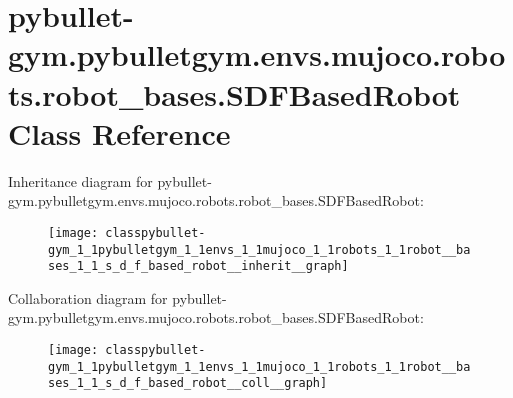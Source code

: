 \hypertarget{classpybullet-gym_1_1pybulletgym_1_1envs_1_1mujoco_1_1robots_1_1robot__bases_1_1_s_d_f_based_robot}{}\section{pybullet-\/gym.pybulletgym.\+envs.\+mujoco.\+robots.\+robot\+\_\+bases.\+S\+D\+F\+Based\+Robot Class Reference}
\label{classpybullet-gym_1_1pybulletgym_1_1envs_1_1mujoco_1_1robots_1_1robot__bases_1_1_s_d_f_based_robot}


Inheritance diagram for pybullet-\/gym.pybulletgym.\+envs.\+mujoco.\+robots.\+robot\+\_\+bases.\+S\+D\+F\+Based\+Robot\+:
\nopagebreak
\begin{figure}[H]
\begin{center}
\leavevmode
\texttt{[image: classpybullet-gym\_1\_1pybulletgym\_1\_1envs\_1\_1mujoco\_1\_1robots\_1\_1robot\_\_bases\_1\_1\_s\_d\_f\_based\_robot\_\_inherit\_\_graph]}
\end{center}
\end{figure}


Collaboration diagram for pybullet-\/gym.pybulletgym.\+envs.\+mujoco.\+robots.\+robot\+\_\+bases.\+S\+D\+F\+Based\+Robot\+:
\nopagebreak
\begin{figure}[H]
\begin{center}
\leavevmode
\texttt{[image: classpybullet-gym\_1\_1pybulletgym\_1\_1envs\_1\_1mujoco\_1\_1robots\_1\_1robot\_\_bases\_1\_1\_s\_d\_f\_based\_robot\_\_coll\_\_graph]}
\end{center}
\end{figure}
